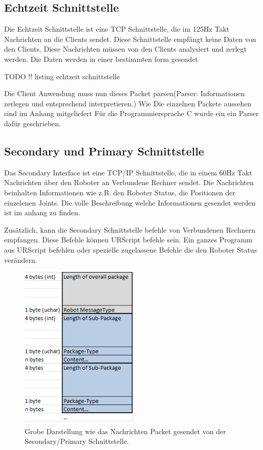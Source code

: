 \subsection{Echtzeit Schnittstelle}
\label{urcontrol_rci_gru}

Die Echtzeit Schnittstelle ist eine TCP Schnittstelle, die im 125Hz Takt Nachrichten an die Clients sendet. Diese Schnittstelle empfängt keine Daten von den Clients. Diese Nachrichten müssen von den Clients analysiert und zerlegt werden. Die Daten werden in einer bestimmten form gesendet

TODO !! listing echtzeit schnittstelle

Die Client Anwendung muss nun dieses Packet parsen(Parser: Informationen zerlegen und entsprechend interpretieren.)
Wie Die einzelnen Packete aussehen sind im Anhang mitgeliefert
Für die Programmiersprache C wurde ein ein Parser dafür geschrieben.

\subsection{Secondary und Primary Schnittstelle}
\label{urcontrol_spi_gru}

Das Secondary Interface ist eine \ac{TCP/IP} Schnittstelle, die in einem 60Hz Takt Nachrichten über den Roboter an Verbundene Rechner sendet.
Die Nachrichten beinhalten Informationen wie z.B. den Roboter Status, die Positionen der einzelenen Joints.
Die volle Beschreibung welche Informationen gesendet werden ist im anhang zu finden.

Zusätzlich, kann die Secondary Schnittstelle befehle von Verbundenen Rechnern empfangen. 
Diese Befehle können URScript befehle sein. Ein ganzes Programm aus URScript befehlen oder spezielle zugelassene Befehle die den Roboter Status verändern.

\begin{figure}[ht]
  \centering
    \includegraphics[width=0.5\textwidth]{pic/secondary_datapackage_scheme.png}
      \caption[Schema des Datenpackets gesendet von der Secondary Schnittstelle]{Grobe Darstellung wie das Nachrichten Packet gesendet von der Secondary/Primary Schnittstelle.}
      \label{fig:datascheme_of_secondary_interface}
\end{figure}


